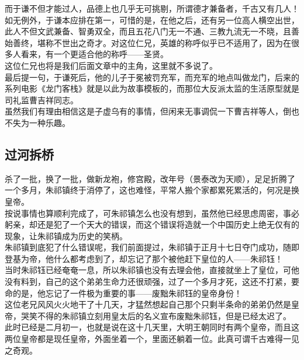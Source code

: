 \begin{multicols}{\theparacolNo}
而于谦不但才能过人，品德上也几乎无可挑剔，所谓德才兼备者，千古又有几人！\\

如无例外，于谦本应排在第一，可惜的是，在他之后，还有另一位高人横空出世，此人不但文武兼备、智勇双全，而且五花八门无一不通、三教九流无一不晓，且善始善终，堪称不世出之奇才。对这位仁兄，英雄的称呼似乎已不适用了，因为在很多人看来，有一个更适合他的称呼——圣贤。\\

这位仁兄也将是我们后面文章中的主角，这里就不多说了。\\

最后提一句，于谦死后，他的儿子于冕被罚充军，而充军的地点叫做龙门，后来的系列电影《龙门客栈》就是以此为故事模板的，而那位大反派太监的生活原型就是司礼监曹吉祥同志。\\

虽然我们有理由相信这是子虚乌有的事情，但闲来无事调侃一下曹吉祥等人，倒也不失为一种乐趣。\\

\subsection{过河拆桥}
杀了一批，换了一批，做新龙袍，修宫殿，改年号（景泰改为天顺），足足折腾了一个多月，朱祁镇终于消停了，这也难怪，平常人搬个家都累死累活的，何况是换皇帝。\\

按说事情也算顺利完成了，可朱祁镇怎么也没有想到，虽然他已经思虑周密，事必躬亲，却还是犯了一个天大的错误，而这个错误将造就一个中国历史上绝无仅有的现象，让朱祁镇成为历史的笑柄。\\

朱祁镇到底犯了什么错误呢，我们前面提过，朱祁镇于正月十七日夺门成功，随即登基为帝，他什么都考虑到了，却忘记了那个被他赶下皇位的人——朱祁钰！\\

当时朱祁钰已经奄奄一息，所以朱祁镇也没有去理会他，直接就坐上了皇位，可他没有料到，自己的这个弟弟生命力还很顽强，过了一个多月才死，这还不打紧，要命的是，他忘记了一件极为重要的事——废黜朱祁钰的皇帝身份！\\

这位老兄风风火火地干了十几天，才猛然想起自己那个只剩半条命的弟弟仍然是皇帝，哭笑不得的朱祁镇立刻用皇太后的名义宣布废黜朱祁钰，但是已经太迟了。\\

此时已经是二月初一，也就是说在这十几天里，大明王朝同时有两个皇帝，而且这两位皇帝都是现任皇帝，外面坐着一个，里面还躺着一位。此真可谓千古难得一见之奇观。\\


\end{multicols}
